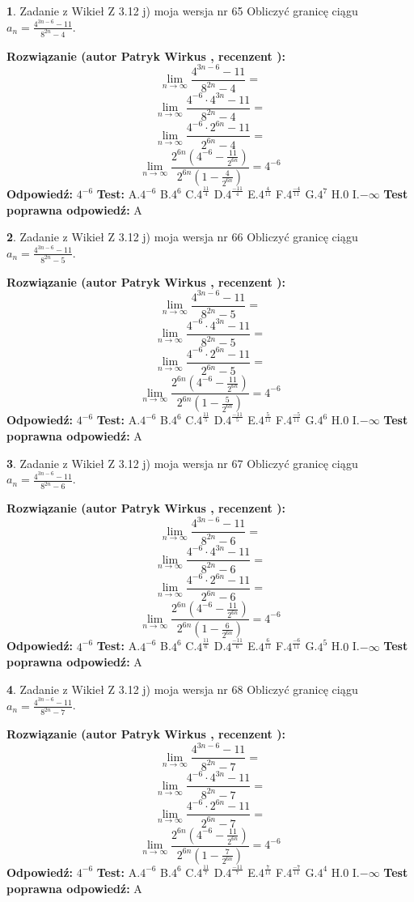\documentclass[12pt, a4paper]{article}
\theoremstyle{definition} %
\newtheorem{zad}{}
\newcommand{\zadStart}[1]{\begin{zad}#1\newline}
\newcommand{\zadStop}{\end{zad}}
\newcommand{\rozwStart}[2]{\noindent \textbf{Rozwiązanie (autor #1 , recenzent #2): }\newline}
\newcommand{\rozwStop}{\newline}
\newcommand{\odpStart}{\noindent \textbf{Odpowiedź:}\newline}
\newcommand{\odpStop}{\newline}
\newcommand{\testStart}{\noindent \textbf{Test:}\newline}
\newcommand{\testStop}{\newline}
\newcommand{\kluczStart}{\noindent \textbf{Test poprawna odpowiedź:}\newline}
\newcommand{\kluczStop}{\newline}
\begin{document}
\zadStart{Zadanie z Wikieł Z 3.12 j) moja wersja nr 65}
Obliczyć granicę ciągu $a_{n}=\frac{4^{3n-6}-11}{8^{2n}-4}$.
\zadStop
\rozwStart{Patryk Wirkus}{}
$$\lim\limits_{n\to\infty}\frac{4^{3n-6}-11}{8^{2n}-4}=$$
$$\lim\limits_{n\to\infty}\frac{4^{-6} \cdot 4^{3n}-11}{8^{2n}-4}=$$
$$\lim\limits_{n\to\infty}\frac{4^{-6} \cdot 2^{6n}-11}{2^{6n}-4}=$$
$$\lim\limits_{n\to\infty}\frac{2^{6n}(4^{-6} - \frac{11}{2^{6n}})}{2^{6n}(1-\frac{4}{2^{6n}})}= 4^{-6}$$
\rozwStop
\odpStart
$4^{-6}$
\odpStop
\testStart
A.$4^{-6}$
B.$4^{6}$
C.$4^{\frac{11}{4}}$
D.$4^{\frac{-11}{4}}$
E.$4^{\frac{4}{11}}$
F.$4^{\frac{-4}{11}}$
G.$4^{7}$
H.$0$
I.$-\infty$
\testStop
\kluczStart
A
\kluczStop



\zadStart{Zadanie z Wikieł Z 3.12 j) moja wersja nr 66}
Obliczyć granicę ciągu $a_{n}=\frac{4^{3n-6}-11}{8^{2n}-5}$.
\zadStop
\rozwStart{Patryk Wirkus}{}
$$\lim\limits_{n\to\infty}\frac{4^{3n-6}-11}{8^{2n}-5}=$$
$$\lim\limits_{n\to\infty}\frac{4^{-6} \cdot 4^{3n}-11}{8^{2n}-5}=$$
$$\lim\limits_{n\to\infty}\frac{4^{-6} \cdot 2^{6n}-11}{2^{6n}-5}=$$
$$\lim\limits_{n\to\infty}\frac{2^{6n}(4^{-6} - \frac{11}{2^{6n}})}{2^{6n}(1-\frac{5}{2^{6n}})}= 4^{-6}$$
\rozwStop
\odpStart
$4^{-6}$
\odpStop
\testStart
A.$4^{-6}$
B.$4^{6}$
C.$4^{\frac{11}{5}}$
D.$4^{\frac{-11}{5}}$
E.$4^{\frac{5}{11}}$
F.$4^{\frac{-5}{11}}$
G.$4^{6}$
H.$0$
I.$-\infty$
\testStop
\kluczStart
A
\kluczStop



\zadStart{Zadanie z Wikieł Z 3.12 j) moja wersja nr 67}
Obliczyć granicę ciągu $a_{n}=\frac{4^{3n-6}-11}{8^{2n}-6}$.
\zadStop
\rozwStart{Patryk Wirkus}{}
$$\lim\limits_{n\to\infty}\frac{4^{3n-6}-11}{8^{2n}-6}=$$
$$\lim\limits_{n\to\infty}\frac{4^{-6} \cdot 4^{3n}-11}{8^{2n}-6}=$$
$$\lim\limits_{n\to\infty}\frac{4^{-6} \cdot 2^{6n}-11}{2^{6n}-6}=$$
$$\lim\limits_{n\to\infty}\frac{2^{6n}(4^{-6} - \frac{11}{2^{6n}})}{2^{6n}(1-\frac{6}{2^{6n}})}= 4^{-6}$$
\rozwStop
\odpStart
$4^{-6}$
\odpStop
\testStart
A.$4^{-6}$
B.$4^{6}$
C.$4^{\frac{11}{6}}$
D.$4^{\frac{-11}{6}}$
E.$4^{\frac{6}{11}}$
F.$4^{\frac{-6}{11}}$
G.$4^{5}$
H.$0$
I.$-\infty$
\testStop
\kluczStart
A
\kluczStop



\zadStart{Zadanie z Wikieł Z 3.12 j) moja wersja nr 68}
Obliczyć granicę ciągu $a_{n}=\frac{4^{3n-6}-11}{8^{2n}-7}$.
\zadStop
\rozwStart{Patryk Wirkus}{}
$$\lim\limits_{n\to\infty}\frac{4^{3n-6}-11}{8^{2n}-7}=$$
$$\lim\limits_{n\to\infty}\frac{4^{-6} \cdot 4^{3n}-11}{8^{2n}-7}=$$
$$\lim\limits_{n\to\infty}\frac{4^{-6} \cdot 2^{6n}-11}{2^{6n}-7}=$$
$$\lim\limits_{n\to\infty}\frac{2^{6n}(4^{-6} - \frac{11}{2^{6n}})}{2^{6n}(1-\frac{7}{2^{6n}})}= 4^{-6}$$
\rozwStop
\odpStart
$4^{-6}$
\odpStop
\testStart
A.$4^{-6}$
B.$4^{6}$
C.$4^{\frac{11}{7}}$
D.$4^{\frac{-11}{7}}$
E.$4^{\frac{7}{11}}$
F.$4^{\frac{-7}{11}}$
G.$4^{4}$
H.$0$
I.$-\infty$
\testStop
\kluczStart
A
\kluczStop
\end{document}
